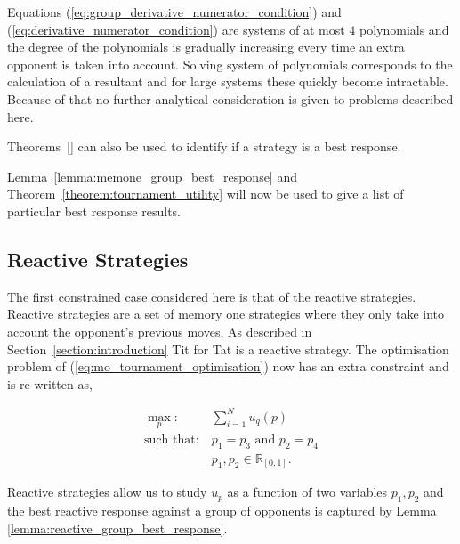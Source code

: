 \documentclass[10pt]{article}
\newcommand{\R}{\mathbb{R}}
\begin{document}
Equations (\ref{eq:group_derivative_numerator_condition}) and
(\ref{eq:derivative_numerator_condition})
are systems of at most \(4\) polynomials and the degree of the polynomials is gradually increasing
every time an extra opponent is taken into account. Solving system of polynomials corresponds
to the calculation of a resultant and for large systems these quickly become intractable.
Because of that no further analytical consideration is given to problems described
here.

Theorems~\ref{} can also be used to identify if a strategy is a best response.

Lemma~\ref{lemma:memone_group_best_response} and
Theorem~\ref{theorem:tournament_utility}
will now be used to give a list of particular best response results.

\subsection{Reactive Strategies}\label{section:reactive_analytical}

The first constrained case considered here is that of the reactive strategies.
Reactive strategies are a set of memory one strategies where they only take into
account the opponent's previous moves. As described in Section~\ref{section:introduction}
Tit for Tat is a reactive strategy. The optimisation problem of (\ref{eq:mo_tournament_optimisation})
now has an extra constraint and is re written as,

\begin{equation}\label{eq:reactive_tournament_optimisation}
\begin{aligned}
\max_p: & \ \sum_{i=1} ^ N u_q(p)
\\
\text{such that}: & \ p_1 = p_3 \text{ and } p_2 = p_4\\
    & \ p_1, p_2 \in \R_{[0, 1]}.
\end{aligned}
\end{equation}

Reactive strategies allow us to study \(u_p\) as a function of two variables
\(p_1, p_2\) and the best reactive response against a group of opponents is captured by Lemma
\ref{lemma:reactive_group_best_response}.
\end{document}
